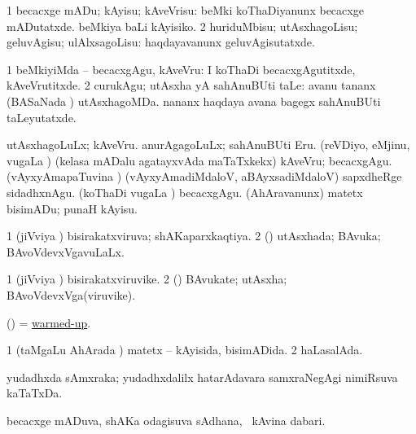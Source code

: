 \bentry
{} 
\gl{\sakirx}
\expl{}
\bmng
\bnum
\num{1} becacxge mADu; kAyisu; kAveVrisu:  beMki koThaDiyanunx becacxge mADutatxde.  beMkiya baLi kAyisiko. 
\num{2} huriduMbisu; utAsxhagoLisu; geluvAgisu; ulAlxsagoLisu:  haqdayavanunx geluvAgisutatxde. 
\enum
\emng

\noindent 
\gl{\akirx}
\expl{}
\bmng
\bnum
\num{1} beMkiyiMda -- becacxgAgu, kAveVru:  I koThaDi becacxgAgutitxde, kAveVrutitxde. 
\num{2} curukAgu; utAsxha yA sahAnuBUti taLe:  avanu tananx (BASaNada \vi) utAsxhagoMDa.  nananx haqdaya avana bagegx sahAnuBUti taLeyutatxde. 
\enum
\emng

\noindent 
\gl{\pagu}
\expl{}
\bmng
{} 
\banum
{} utAsxhagoLuLx; kAveVru. 
 anurAgagoLuLx; sahAnuBUti Eru. 
 (reVDiyo, eMjinu, \mo vugaLa \vi) (kelasa mADalu agatayxvAda maTaTxkekx) kAveVru; becacxgAgu. 
 (vAyxyAmapaTuvina \vi) (vAyxyAmadiMdaloV, aBAyxsadiMdaloV) sapxdheRge sidadhxnAgu. 
 (koThaDi \mo vugaLa \vi) becacxgAgu. 
 (AhAravanunx) matetx bisimADu; punaH kAyisu. 
\eanum
\emng
\eentry

\bentry
{} 
\gl{\gu}
\expl{}
\bmng
\bnum
\num{1} (jiVviya \vi) bisirakatxviruva; shAKaparxkaqtiya. 
\num{2} (\rUpa) utAsxhada; BAvuka; BAvoVdevxVgavuLaLx. 
\enum
\emng
\eentry

\bentry
{} 
\gl{\nA}
\expl{}
\bmng
\bnum
\num{1} (jiVviya \vi) bisirakatxviruvike. 
\num{2} (\rUpa) BAvukate; utAsxha; BAvoVdevxVga(viruvike). 
\enum
\emng
\eentry

\bentry
{} 
\gl{\gu}
\expl{}
\bmng
(\ame) = \hyperlink{warmed-up}{warmed-up}. 
\emng
\eentry

\bentry
{} 
\gl{\gu}
\expl{}
\bmng
\bnum
\num{1} (taMgaLu AhArada \vi) matetx -- kAyisida, bisimADida. 
\num{2} haLasalAda. 
\enum
\emng
\eentry

\bentry
{} 
\gl{\nA}
\expl{}
\bmng
yudadhxda sAmxraka; yudadhxdalilx hatarAdavara samxraNegAgi nimiRsuva kaTaTxDa. 
\emng
\eentry

\bentry
{} 
\gl{\nA}
\expl{}
\bmng
becacxge mADuva, shAKa odagisuva sAdhana, \udA\ kAvina dabari. 
\emng
\eentry

